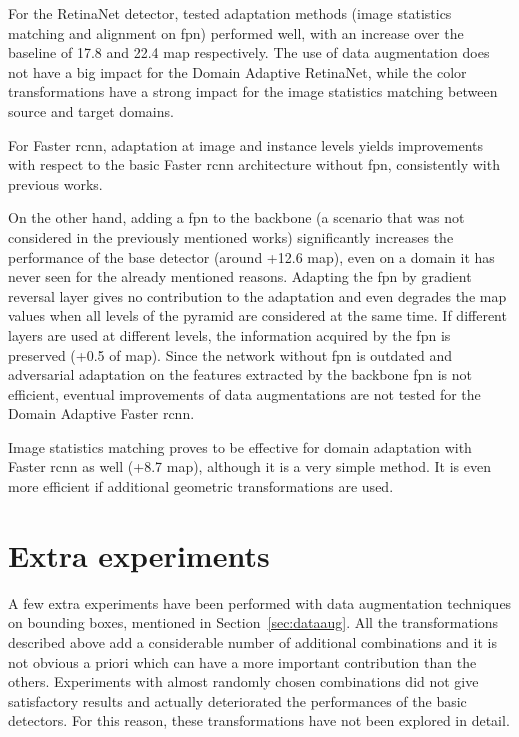 \documentclass[%
    corpo=12pt,
    twoside,
    stile=classica,   
    tipotesi=magistrale,
    evenboxes,
    english,
	numerazioneromana,
]{toptesi}
\begin{document}
\bigskip
For the RetinaNet detector, tested adaptation methods (image statistics matching and alignment on \gls{fpn}) performed well, with an increase over the baseline of 17.8 and 22.4 \gls{map} respectively. The use of data augmentation does not have a big impact for the Domain Adaptive RetinaNet, while the color transformations have a strong impact for the image statistics matching between source and target domains.

\bigskip
For Faster \gls{rcnn}, adaptation at image and instance levels yields improvements with respect to the basic Faster \gls{rcnn} architecture without \gls{fpn}, consistently with previous works\cite{abramov2020simple}\cite{chen2018domain}\cite{saito2017asymmetric}.

On the other hand, adding a \gls{fpn} to the backbone (a scenario that was not considered in the previously mentioned works) significantly increases the performance of the base detector (around +12.6 \acrshort{map}), even on a domain it has never seen for the already mentioned reasons. Adapting the \gls{fpn} by gradient reversal layer gives no contribution to the adaptation and even degrades the \gls{map} values when all levels of the pyramid are considered at the same time. If different layers are used at different levels, the information acquired by the \gls{fpn} is preserved (+0.5 of \gls{map}). Since the network without \gls{fpn} is outdated and adversarial adaptation on the features extracted by the backbone \gls{fpn} is not efficient, eventual improvements of data augmentations are not tested for the Domain Adaptive Faster \gls{rcnn}.

Image statistics matching proves to be effective for domain adaptation with Faster \gls{rcnn} as well (+8.7 \gls{map}), although it is a very simple method. It is even more efficient if additional geometric transformations are used.

\section{Extra experiments}
A few extra experiments have been performed with data augmentation techniques on bounding boxes, mentioned in Section~\ref{sec:dataaug}. All the transformations described above add a considerable number of additional combinations and it is not obvious a priori which can have a more important contribution than the others. Experiments with almost randomly chosen combinations did not give satisfactory results and actually deteriorated the performances of the basic detectors. For this reason, these transformations have not been explored in detail.
\end{document}
